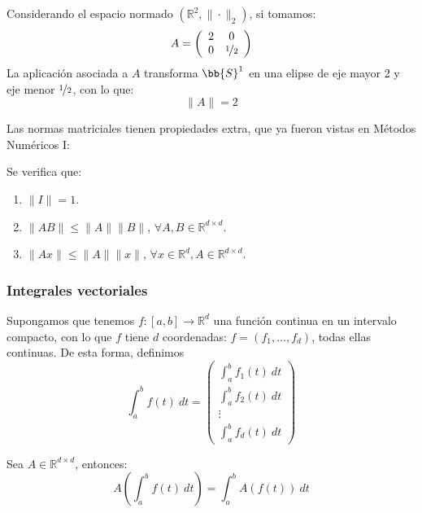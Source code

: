 \begin{ejemplo}
    Considerando el espacio normado $(\mathbb{R}^2, \|\cdot \|_2)$, si tomamos:
    \begin{equation*}
        A = \left(\begin{array}{cc}
                2 & 0 \\
                0 & \nicefrac{1}{2}
        \end{array}\right)
    \end{equation*}
    La aplicación asociada a $A$ transforma $\bb{S}^1$ en una elipse de eje mayor 2 y eje menor $\nicefrac{1}{2}$, con lo que:
    \begin{equation*}
        \|A\| = 2
    \end{equation*}
\end{ejemplo}

Las normas matriciales tienen propiedades extra, que ya fueron vistas en Métodos Numéricos I\@:
\begin{prop}
    Se verifica que:
    \begin{enumerate}
        \item $\|I\| = 1$.
        \item $\|AB\| \leq \|A\|\|B\|$, $\forall A,B\in \mathbb{R}^{d\times d}$.
        \item $\|Ax\| \leq \|A\|\|x\|$, $\forall x\in \mathbb{R}^d, A\in \mathbb{R}^{d\times d}$.
    \end{enumerate}
\end{prop}

\subsubsection{Integrales vectoriales}
Supongamos que tenemos $f:[a,b]\rightarrow \mathbb{R}^d$ una función continua en un intervalo compacto, con lo que $f$ tiene $d$ coordenadas: $f=(f_1,\ldots,f_d)$, todas ellas continuas. De esta forma, definimos
\begin{equation*}
    \int_{a}^{b} f(t)~dt  = \left(\begin{array}{c}
        \int_{a}^{b} f_1(t)~dt  \\
        \int_{a}^{b} f_2(t)~dt  \\
        \vdots \\
        \int_{a}^{b} f_d(t)~dt  
    \end{array}\right)
\end{equation*}

\begin{prop}
    Sea $A\in \mathbb{R}^{d\times d}$, entonces:
    \begin{equation*}
        A\left(\int_{a}^{b} f(t)~dt \right) = \int_{a}^{b} A(f(t))~dt
    \end{equation*}
\end{prop}

